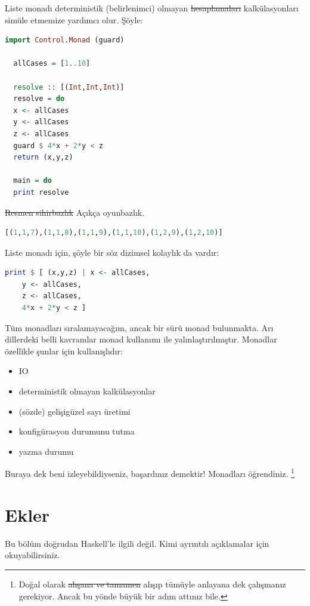 \documentclass[a4paper,14pt,openany]{extbook} %
\providecommand{\tightlist}{%
  \setlength{\itemsep}{0pt}\setlength{\parskip}{0pt}}
\begin{document}
Liste monadı deterministik (belirlenimci) olmayan \st{hesaplamaları} kalkülasyonları simüle etmemize yardımcı olur. Şöyle:

\begin{lstlisting}[language=Haskell]
  import Control.Monad (guard)

  allCases = [1..10]

  resolve :: [(Int,Int,Int)]
  resolve = do
  x <- allCases
  y <- allCases
  z <- allCases
  guard $ 4*x + 2*y < z
  return (x,y,z)

  main = do
  print resolve
\end{lstlisting}

\st{Resmen sihirbazlık} Açıkça oyunbazlık.

\begin{lstlisting}[language=Haskell]
  [(1,1,7),(1,1,8),(1,1,9),(1,1,10),(1,2,9),(1,2,10)]
\end{lstlisting}

Liste monadı için, şöyle bir söz dizimsel kolaylık da vardır:

\begin{lstlisting}[language=Haskell]
  print $ [ (x,y,z) | x <- allCases,
    y <- allCases,
    z <- allCases,
    4*x + 2*y < z ]
\end{lstlisting}

Tüm monadları sıralamayacağım, ancak bir sürü monad bulunmakta. Arı
dillerdeki belli kavramlar monad kullanımı ile yalınlaştırılmıştır.
Monadlar özellikle şunlar için kullanışlıdır:

\begin{itemize}\tightlist
\item IO
\item deterministik olmayan kalkülasyonlar
\item (sözde) gelişigüzel sayı üretimi
\item konfigürasyon durumunu tutma
\item yazma durumu
\end{itemize}

Buraya dek beni izleyebildiyseniz, başardınız demektir!
Monadları öğrendiniz. \footnote{Doğal olarak \st{alışana ve tamamen} alışıp tümüyle anlayana dek
  çalışmanız gerekiyor. Ancak bu yönde büyük bir adım attınız bile.}

\part{Ekler}\label{ekler}

Bu bölüm doğrudan Haskell'le ilgili değil. Kimi ayrıntılı açıklamalar
için okuyabilirsiniz.
\end{document}
